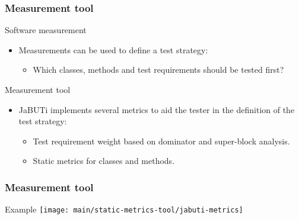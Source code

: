 \begin{frame}[parent={cmap:jabuti-measurement-tool},hasnext=true,hasprev=true]
\frametitle{Measurement tool}
\label{concept:measurement-tool}
\label{concept:metric-tool}
\label{concept:software-measurement-tool}
\label{concept:jabuti-measurement-tool}

\begin{block:concept}{Software measurement}
\begin{itemize}
	\item<1-> Measurements can be used to define a test strategy:
	\begin{itemize}
		\item Which classes, methods and test requirements should be tested
		first?
	\end{itemize}
\end{itemize}
\end{block:concept}

\begin{block:concept}{Measurement tool}
\begin{itemize}
	\item<2-> JaBUTi implements several metrics to aid the tester in the
	definition of the test strategy:
	\begin{itemize}
		\item Test requirement weight based on dominator and super-block
		analysis.

		\item Static metrics for classes and methods.
	\end{itemize}
\end{itemize}
\end{block:concept}
\end{frame}


\begin{frame}
\frametitle{Measurement tool}

\begin{block}{Example}
\texttt{[image: main/static-metrics-tool/jabuti-metrics]}
\end{block}
\end{frame}

